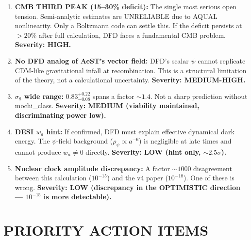 \documentclass[11pt]{article}
\begin{document}
\begin{tcolorbox}[colback=red!5!white, colframe=red!60!black,
  title=\textbf{HONEST NEGATIVES (i22)}]

\begin{enumerate}

\item \textbf{CMB THIRD PEAK (15--30\% deficit):}  The single most serious
  open tension.  Semi-analytic estimates are UNRELIABLE due to AQUAL
  nonlinearity.  Only a Boltzmann code can settle this.  If the deficit
  persists at $>20\%$ after full calculation, DFD faces a fundamental
  CMB problem.  \textbf{Severity: HIGH.}

\item \textbf{No DFD analog of AeST's vector field:}  DFD's scalar $\psi$
  cannot replicate CDM-like gravitational infall at recombination.
  This is a structural limitation of the theory, not a calculational
  uncertainty.  \textbf{Severity: MEDIUM-HIGH.}

\item \textbf{$\sigma_8$ wide range:}  $0.83^{+0.22}_{-0.08}$ spans
  a factor $\sim 1.4$.  Not a sharp prediction without mochi\_class.
  \textbf{Severity: MEDIUM (viability maintained, discriminating power low).}

\item \textbf{DESI $w_a$ hint:}  If confirmed, DFD must explain
  effective dynamical dark energy.  The $\psi$-field background
  ($\rho_\psi \propto a^{-6}$) is negligible at late times and cannot
  produce $w_a \neq 0$ directly.  \textbf{Severity: LOW (hint only,
  $\sim 2.5\sigma$).}

\item \textbf{Nuclear clock amplitude discrepancy:}  A factor $\sim 1000$
  disagreement between this calculation ($10^{-15}$) and the v4 paper
  ($10^{-18}$).  One of these is wrong.  \textbf{Severity: LOW
  (discrepancy in the OPTIMISTIC direction --- $10^{-15}$ is more
  detectable).}

\end{enumerate}
\end{tcolorbox}


\section{PRIORITY ACTION ITEMS}
\end{document}
